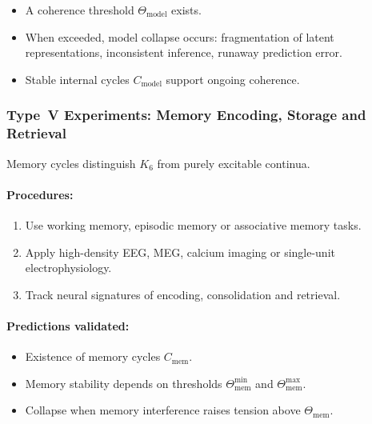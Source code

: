 \begin{itemize}
    \item A coherence threshold $\Theta_{\mathrm{model}}$ exists.
    \item When exceeded, model collapse occurs:
          fragmentation of latent representations,
          inconsistent inference,
          runaway prediction error.
    \item Stable internal cycles $C_{\mathrm{model}}$ support
          ongoing coherence.
\end{itemize}



\subsubsection{Type~V Experiments: Memory Encoding, Storage and Retrieval}

Memory cycles distinguish $K_6$ from purely excitable continua.

\paragraph{Procedures:}

\begin{enumerate}
    \item Use working memory, episodic memory or associative memory tasks.
    \item Apply high-density EEG, MEG, calcium imaging or single-unit
          electrophysiology.
    \item Track neural signatures of encoding, consolidation and retrieval.
\end{enumerate}

\paragraph{Predictions validated:}

\begin{itemize}
    \item Existence of memory cycles $C_{\mathrm{mem}}$.
    \item Memory stability depends on thresholds 
          $\Theta_{\mathrm{mem}}^{\min}$ and
          $\Theta_{\mathrm{mem}}^{\max}$.
    \item Collapse when memory interference raises tension
          above $\Theta_{\mathrm{mem}}$.
\end{itemize}



